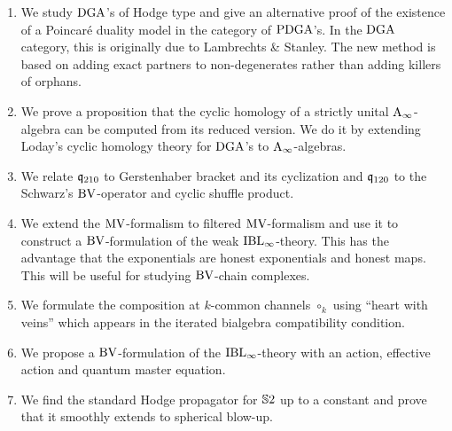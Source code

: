 \documentclass[\MainFolder/Text.tex]{subfiles}
\begin{document}
\begin{enumerate}[label=\arabic*)]
\item We study $\mathrm{DGA}$'s of Hodge type and give an alternative proof of the existence of a Poincar\'e duality model in the category of $\mathrm{PDGA}$'s.
In the $\mathrm{DGA}$ category, this is originally due to Lambrechts \& Stanley.
The new method is based on adding exact partners to non-degenerates rather than adding killers of orphans.
 
\item We prove a proposition that the cyclic homology of a strictly unital $\mathrm{A}_\infty$-algebra can be computed from its reduced version.
We do it by extending Loday's cyclic homology theory for $\mathrm{DGA}$'s to $\mathrm{A}_\infty$-algebras.

\item We relate $\mathfrak{q}_{210}$ to Gerstenhaber bracket and its cyclization and $\mathfrak{q}_{120}$ to the Schwarz's $\mathrm{BV}$-operator and cyclic shuffle product.

\item We extend the $\mathrm{MV}$-formalism to filtered $\mathrm{MV}$-formalism and use it to construct a $\mathrm{BV}$-formulation of the weak $\mathrm{IBL}_\infty$-theory.
This has the advantage that the exponentials are honest exponentials and honest maps.
This will be useful for studying $\mathrm{BV}$-chain complexes.

\item We formulate the composition at $k$-common channels $\circ_k$ using ``heart with veins'' which appears in the iterated bialgebra compatibility condition.

\item We propose a $\mathrm{BV}$-formulation of the $\mathrm{IBL}_\infty$-theory with an action, effective action and quantum master equation.

\item We find the standard Hodge propagator for $\mathbb{S}{2}$ up to a constant and prove that it smoothly extends to spherical blow-up.
\end{enumerate}

%
\end{document}
